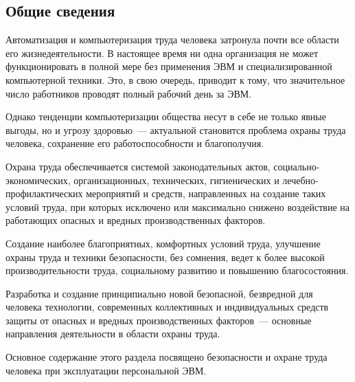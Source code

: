 \subsection{Общие сведения}

Автоматизация и компьютеризация труда человека затронула почти все области его жизнедеятельности.
В настоящее время ни одна организация не может функционировать в полной мере без применения ЭВМ и специализированной компьютерной техники.
Это, в свою очередь, приводит к тому, что значительное число работников проводят полный рабочий день за ЭВМ.

Однако тенденции компьютеризации общества несут в себе не только явные выгоды, но и угрозу здоровью~--- актуальной становится проблема охраны труда человека, сохранение его работоспособности и благополучия.

Охрана труда обеспечивается системой законодательных актов, социально-экономических, организационных, технических, гигиенических и лечебно-профилактических мероприятий и средств, направленных на создание таких условий труда, при которых исключено или максимально снижено воздействие на работающих опасных и вредных производственных факторов.

Создание наиболее благоприятных, комфортных условий труда, улучшение охраны труда и техники безопасности, без сомнения, ведет к более высокой производительности труда, социальному развитию и повышению благосостояния.

Разработка и создание принципиально новой безопасной, безвредной для человека технологии, современных коллективных и индивидуальных средств защиты от опасных и вредных производственных факторов~--- основные направления деятельности в области охраны труда.

Основное содержание этого раздела посвящено безопасности и охране труда человека при эксплуатации персональной ЭВМ.

